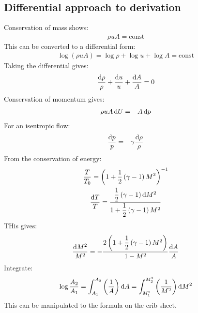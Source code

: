 \subsection{Differential approach to derivation}
Conservation of mass shows:
\begin{gather}
    \rho u A = \textrm{const}
\end{gather}
This can be converted to a differential form:
\begin{gather}
    \log\left(\rho u A\right) = \log \rho + \log u + \log A = \textrm{const}
\end{gather}
Taking the differential gives:
\begin{gather}
    \dfrac{\dif \rho}{\rho} + \dfrac{\dif u }{u} + \dfrac{\dif A}{A} = 0
\end{gather}
Conservation of momentum gives:
\begin{gather}
    \rho u A \dif U = - A \dif p
\end{gather}
For an isentropic flow:
\begin{gather}
    \dfrac{\dif p}{p} = - \gamma \dfrac{\dif \rho}{\rho}
\end{gather}
From the conservation of energy:
\begin{gather}
    \dfrac{T}{T_0} = \left(1 + \dfrac{1}{2}\left(\gamma - 1\right)M^2\right)^{-1}\\
    \dfrac{\dif T}{T} = \dfrac{\dfrac{1}{2}\left(\gamma -1\right)\dif M^2}{1 + \dfrac{1}{2}\left(\gamma -1 \right)M^2}
\end{gather}
THis gives:
\begin{gather}
    \dfrac{\dif M^2}{M^2} = -\dfrac{2\left(1 + \dfrac{1}{2}\left(\gamma - 1\right)M^2\right)}{1-M^2}\dfrac{\dif A}{A}
\end{gather}
Integrate:
\begin{gather}
    \log \frac{A_2}{A_1} = \int_{A_1}^{A_2} \left(\frac{1}{A}\right)\dif A = \int_{M^2_1}^{M^2_2}\left(\frac{1}{M^2}\right)\dif M^2
\end{gather}
This can be manipulated to the formula on the crib sheet.
